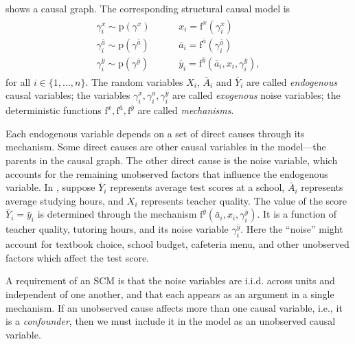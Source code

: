 \documentclass[12pt]{article}
\newcommand{\pr}{\mathrm{p}}
\newcommand{\f}{\mathrm{f}}
\begin{document}
 shows a causal graph. The corresponding structural causal model is
\begin{align}
  \label{eqn:ex-scm}
  \begin{split}
    \gamma_i^{x} \sim \pr(\gamma^{x}) \quad & \,\,\,\,\,\,\, x_i = \f^x(\gamma^{x}_i)\\
    \gamma_i^{\bar{a}} \sim \pr(\gamma^{\bar{a}}) \,\,\,\,\,\,&\,\,\,\,\,\,\, \bar{a}_i = \f^{\bar{a}}(\gamma^{\bar{a}}_i)\\
    \gamma_i^{\bar{y}} \sim \pr(\gamma^{\bar{y}}) \,\,\,\,\,\,&\,\,\,\,\,\,\, \bar{y}_i = \f^{\bar{y}}(\bar{a}_i, x_i, \gamma_i^{\bar{y}}),
  \end{split}
\end{align}
for all $i \in \{1, \ldots, n\}$. The random variables $X_i$, $\bar{A}_i$ and $\bar{Y}_i$ are called \textit{endogenous} causal variables; the variables $\gamma^{x}_i, \gamma^{a}_i, \gamma^{\bar{y}}_i$ are called \textit{exogenous} noise variables; the deterministic functions $\f^{x}, \f^{\bar{a}}, \f^{\bar{y}}$ are called \textit{mechanisms}.

Each endogenous variable depends on a set of direct causes through its mechanism. Some direct causes are other causal variables in the model---the parents in the causal graph.  The other direct cause is the noise variable, which accounts for the remaining unobserved factors that influence the endogenous variable. In , suppose $\bar{Y}_i$ represents average test scores at a school, $\bar{A}_i$ represents average studying hours, and $X_i$ represents teacher quality. The value of the score $\bar{Y}_i=\bar{y}_i$ is determined through the mechanism $\f^{\bar{y}}(\bar{a}_i, x_i, \gamma_i^{\bar{y}})$. It is a function of teacher quality, tutoring hours, and its noise variable $\gamma_i^{\bar{y}}$. Here the ``noise'' might account for textbook choice, school budget, cafeteria menu, and other unobserved factors which affect the test score.

A requirement of an SCM is that the noise variables are i.i.d. across units and independent of one another, and that each appears as an argument in a single mechanism.  If an unobserved cause affects more than one causal variable, i.e., it is a \textit{confounder}, then we must include it in the model as an unobserved causal variable.
\end{document}
